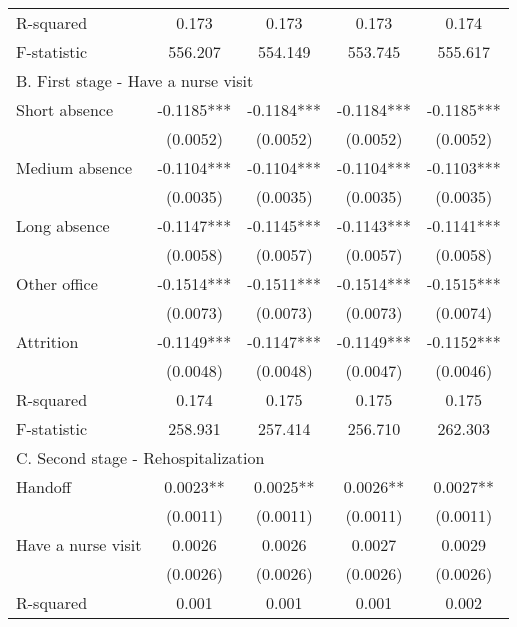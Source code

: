 \documentclass[final,12pt, notitlepage]{article}
\begin{document}
\begin{singlespace}
\begin{table}[H]
\begin{threeparttable}
{\begin{tabular*}{\textwidth}{l@{\extracolsep{\fill}}*{4}{c}}
R-squared           &       0.173   &       0.173   &       0.173   &       0.174   \\
F-statistic         &     556.207   &     554.149   &     553.745   &     555.617   \\
\multicolumn{5}{l}{B. First stage - Have a nurse visit} \\
Short absence       &     -0.1185***&     -0.1184***&     -0.1184***&     -0.1185***\\
                    &    (0.0052)   &    (0.0052)   &    (0.0052)   &    (0.0052)   \\
Medium absence      &     -0.1104***&     -0.1104***&     -0.1104***&     -0.1103***\\
                    &    (0.0035)   &    (0.0035)   &    (0.0035)   &    (0.0035)   \\
Long absence        &     -0.1147***&     -0.1145***&     -0.1143***&     -0.1141***\\
                    &    (0.0058)   &    (0.0057)   &    (0.0057)   &    (0.0058)   \\
Other office        &     -0.1514***&     -0.1511***&     -0.1514***&     -0.1515***\\
                    &    (0.0073)   &    (0.0073)   &    (0.0073)   &    (0.0074)   \\
Attrition           &     -0.1149***&     -0.1147***&     -0.1149***&     -0.1152***\\
                    &    (0.0048)   &    (0.0048)   &    (0.0047)   &    (0.0046)   \\
R-squared           &       0.174   &       0.175   &       0.175   &       0.175   \\
F-statistic         &     258.931   &     257.414   &     256.710   &     262.303   \\
\multicolumn{5}{l}{C. Second stage - Rehospitalization} \\
Handoff             &      0.0023** &      0.0025** &      0.0026** &      0.0027** \\
                    &    (0.0011)   &    (0.0011)   &    (0.0011)   &    (0.0011)   \\
Have a nurse visit  &      0.0026   &      0.0026   &      0.0027   &      0.0029   \\
                    &    (0.0026)   &    (0.0026)   &    (0.0026)   &    (0.0026)   \\
R-squared           &       0.001   &       0.001   &       0.001   &       0.002   \\

\end{tabular*}}
\end{threeparttable}
\end{table}
\end{singlespace}
\end{document}
